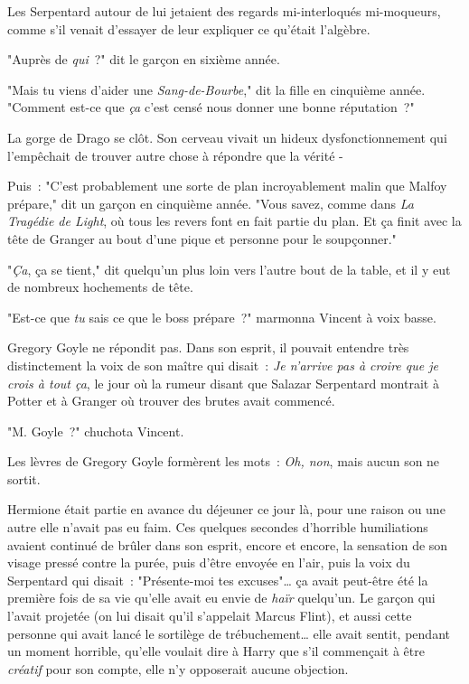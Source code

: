 Les Serpentard autour de lui jetaient des regards mi-interloqués mi-moqueurs, comme s'il venait d'essayer de leur expliquer ce qu'était l'algèbre.

"Auprès de \emph{qui}~?" dit le garçon en sixième année.

"Mais tu viens d'aider une \emph{Sang-de-Bourbe}," dit la fille en cinquième année. "Comment est-ce que \emph{ça} c'est censé nous donner une bonne réputation~?"

La gorge de Drago se clôt. Son cerveau vivait un hideux dysfonctionnement qui l'empêchait de trouver autre chose à répondre que la vérité -

Puis~: "C'est probablement une sorte de plan incroyablement malin que Malfoy prépare," dit un garçon en cinquième année. "Vous savez, comme dans \emph{La Tragédie de Light}, où tous les revers font en fait partie du plan. Et ça finit avec la tête de Granger au bout d'une pique et personne pour le soupçonner."

"\emph{Ça}, ça se tient," dit quelqu'un plus loin vers l'autre bout de la table, et il y eut de nombreux hochements de tête.

\later

"Est-ce que \emph{tu} sais ce que le boss prépare~?" marmonna Vincent à voix basse.

Gregory Goyle ne répondit pas. Dans son esprit, il pouvait entendre très distinctement la voix de son maître qui disait~: \emph{Je n'arrive pas à croire que je crois à tout ça}, le jour où la rumeur disant que Salazar Serpentard montrait à Potter et à Granger où trouver des brutes avait commencé.

"M. Goyle~?" chuchota Vincent.

Les lèvres de Gregory Goyle formèrent les mots~: \emph{Oh, non}, mais aucun son ne sortit.

\later

Hermione était partie en avance du déjeuner ce jour là, pour une raison ou une autre elle n'avait pas eu faim. Ces quelques secondes d'horrible humiliations avaient continué de brûler dans son esprit, encore et encore, la sensation de son visage pressé contre la purée, puis d'être envoyée en l'air, puis la voix du Serpentard qui disait~: "Présente-moi tes excuses"… ça avait peut-être été la première fois de sa vie qu'elle avait eu envie de \emph{haïr} quelqu'un. Le garçon qui l'avait projetée (on lui disait qu'il s'appelait Marcus Flint), et aussi cette personne qui avait lancé le sortilège de trébuchement… elle avait sentit, pendant un moment horrible, qu'elle voulait dire à Harry que s'il commençait à être \emph{créatif} pour son compte, elle n'y opposerait aucune objection.

